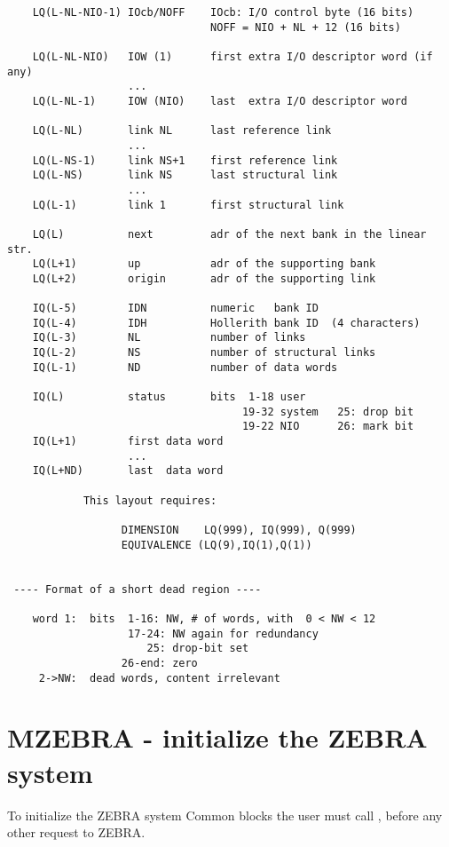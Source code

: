 \begin{verbatim}
    LQ(L-NL-NIO-1) IOcb/NOFF    IOcb: I/O control byte (16 bits)
                                NOFF = NIO + NL + 12 (16 bits)

    LQ(L-NL-NIO)   IOW (1)      first extra I/O descriptor word (if any)
                   ...
    LQ(L-NL-1)     IOW (NIO)    last  extra I/O descriptor word

    LQ(L-NL)       link NL      last reference link
                   ...
    LQ(L-NS-1)     link NS+1    first reference link
    LQ(L-NS)       link NS      last structural link
                   ...
    LQ(L-1)        link 1       first structural link

    LQ(L)          next         adr of the next bank in the linear str.
    LQ(L+1)        up           adr of the supporting bank
    LQ(L+2)        origin       adr of the supporting link

    IQ(L-5)        IDN          numeric   bank ID
    IQ(L-4)        IDH          Hollerith bank ID  (4 characters)
    IQ(L-3)        NL           number of links
    IQ(L-2)        NS           number of structural links
    IQ(L-1)        ND           number of data words

    IQ(L)          status       bits  1-18 user
                                     19-32 system   25: drop bit
                                     19-22 NIO      26: mark bit
    IQ(L+1)        first data word
                   ...
    IQ(L+ND)       last  data word

            This layout requires:

                  DIMENSION    LQ(999), IQ(999), Q(999)
                  EQUIVALENCE (LQ(9),IQ(1),Q(1))


 ---- Format of a short dead region ----

    word 1:  bits  1-16: NW, # of words, with  0 < NW < 12
                   17-24: NW again for redundancy
                      25: drop-bit set
                  26-end: zero
     2->NW:  dead words, content irrelevant
\end{verbatim} 

\section{MZEBRA - initialize the ZEBRA system}

To initialize the ZEBRA system Common blocks the user must call
, before any other request to ZEBRA.

